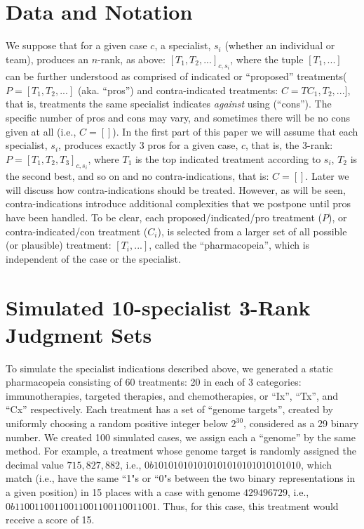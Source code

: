 \documentclass{article}
\begin{document}
\section{Data and Notation}

We suppose that for a given case $c$, a specialist, $s_i$ (whether an individual or team), produces an $n$-rank, as above: $[T_1, T_2, ...]_{c,s_i}$, where the tuple $[T_1, ...]$ can be further understood as comprised of indicated or ``proposed'' treatments( $P=[T_1, T_2, ...]$ (aka. ``pros'') and contra-indicated treatments: $C=TC_1, T_2,...]$, that is, treatments the same specialist indicates \textit{against} using (``cons''). The specific number of pros and cons may vary, and sometimes there will be no cons given at all (i.e., $C=[]$). In the first part of this paper we will assume that each specialist, $s_i$, produces exactly 3 pros for a given case, $c$, that is, the $3$-rank: $P=[T_1, T_2, T_3]_{c,s_i}$, where $T_1$ is the top indicated treatment according to $s_i$, $T_2$ is the second best, and so on and no contra-indications, that is: $C=[]$. Later we will discuss how contra-indications should be treated. However, as will be seen, contra-indications introduce additional complexities that we postpone until pros  have been handled. To be clear, each proposed/indicated/pro treatment ($P$), or contra-indicated/con treatment ($C_i$), is selected from a larger set of all possible (or plausible) treatment: $[T_i,...]$, called the ``pharmacopeia'', which is independent of the case or the specialist.

\section{Simulated 10-specialist 3-Rank Judgment Sets}

To simulate the specialist indications described above, we generated a static pharmacopeia consisting of 60 treatments: 20 in each of 3 categories: immunotherapies, targeted therapies, and chemotherapies, or ``Ix'', ``Tx'', and ``Cx'' respectively. Each treatment has a set of ``genome targets'', created by uniformly choosing a random positive integer below $2^{30}$, considered as a 29 binary number. We created 100 simulated cases, we assign each a ``genome'' by the same method. For example, a treatment whose genome target is randomly assigned the decimal value $715,827,882$, i.e., $0b101010101010101010101010101010$, which match (i.e., have the same ``1"s or ``0"s between the two binary representations in a given position) in 15 places with a case with genome $429496729$, i.e.,  $0b11001100110011001100110011001$. Thus, for this case, this treatment would receive a score of 15.  
\end{document}
